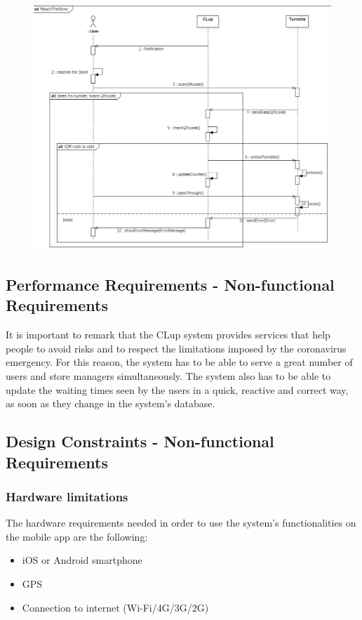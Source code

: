 \documentclass{article}
\begin{document}
\begin{figure}[H]
  \includegraphics[width=\linewidth]{ReachStoreSequence.png}
  
\end{figure}




\subsection{Performance Requirements - Non-functional Requirements}
It is important to remark that the CLup system provides services that help people to avoid risks and to respect the limitations imposed by the coronavirus emergency. For this reason, the system has to be able to serve a great number of users and store managers simultaneously. The system also has to be able to update the waiting times seen by the users in a quick, reactive and correct way, as soon as they change in the system’s database.

\subsection{Design Constraints - Non-functional Requirements}
\subsubsection{Hardware limitations}
The hardware requirements needed in order to use the system’s functionalities on the mobile app are the following:
\begin{itemize}
\item iOS or Android smartphone 
\item GPS
\item Connection to internet (Wi-Fi/4G/3G/2G) 
\end{itemize}
\end{document}
